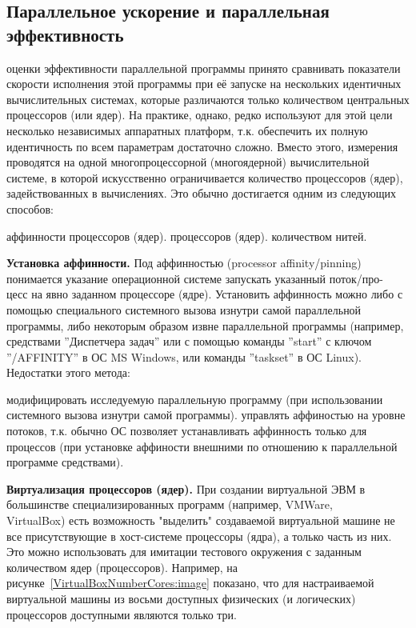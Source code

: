 { %
	\subsection{Параллельное ускорение и параллельная эффективность}
	 оценки эффективности параллельной программы принято сравнивать показатели скорости исполнения этой программы при её запуске на нескольких идентичных вычислительных системах, которые различаются только количеством центральных процессоров (или ядер). На практике, однако, редко используют для этой цели несколько независимых аппаратных платформ, т.к. обеспечить их полную идентичность по всем параметрам достаточно сложно. Вместо этого, измерения проводятся на одной многопроцессорной (многоядерной) вычислительной системе, в которой искусственно ограничивается количество процессоров (ядер), задействованных в вычислениях. Это обычно достигается одним из следующих способов:
	\begin{itemize}
		 аффинности процессоров (ядер).
		 процессоров (ядер).
		 количеством нитей.
	\end{itemize}
	\textbf{Установка аффинности.} Под аффинностью (processor affinity/pinning) понимается указание операционной системе запускать указанный поток/про-\\цесс на явно заданном процессоре (ядре). Установить аффинность можно либо с помощью специального системного вызова изнутри самой параллельной программы, либо некоторым образом извне параллельной программы (например, средствами ''Диспетчера задач'' или с помощью команды ''start'' с ключом ''/AFFINITY'' в ОС MS Windows, или команды ''taskset'' в ОС Linux). Недостатки этого метода:
	\begin{itemize}
		 модифицировать исследуемую параллельную программу (при использовании системного вызова изнутри самой программы).
		 управлять аффиностью на уровне потоков, т.к. обычно ОС позволяет устанавливать аффинность только для процессов (при установке аффиности внешними по отношению к параллельной программе средствами).
	\end{itemize}
	\textbf{Виртуализация процессоров (ядер).} При создании виртуальной ЭВМ в большинстве специализированных программ (например, VMWare, \\VirtualBox) есть возможность "выделить" создаваемой виртуальной машине не все присутствующие в хост-системе процессоры (ядра), а только часть из них. Это можно использовать для имитации тестового окружения с заданным количеством ядер (процессоров). Например, на рисунке~\ref{VirtualBoxNumberCores:image} показано, что для настраиваемой виртуальной машины из восьми доступных физических (и логических) процессоров доступными являются только три.
}

